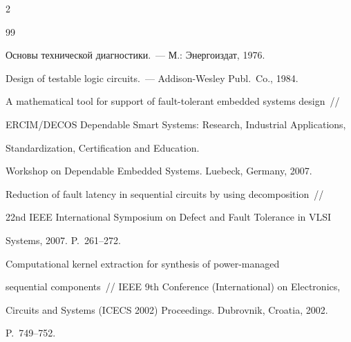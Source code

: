 \begin{multicols}{2}
{{\begin{thebibliography}{99}




Основы технической диагностики.~--- М.: Энергоиздат, 1976.









Design of testable logic circuits.~--- Addison-Wesley Publ.\ Co., 1984.









A mathematical tool for support of fault-tolerant embedded systems design~//


ERCIM/DECOS Dependable Smart Systems: Research, Industrial Applications,


Standardization, Certification and Education.


Workshop on Dependable Embedded Systems. Luebeck, Germany, 2007.









Reduction of fault latency in sequential circuits by using decomposition~//


22nd IEEE International Symposium on Defect and Fault Tolerance in VLSI


Systems, 2007. P.~261--272.








\label{end\stat}









Computational kernel extraction for synthesis of power-managed


sequential components~// IEEE 9th Conference (International) on Electronics,


Circuits and Systems (ICECS 2002) Proceedings. Dubrovnik, Croatia, 2002.


P.~749--752.


 \end{thebibliography}


}


}


\end{multicols}


